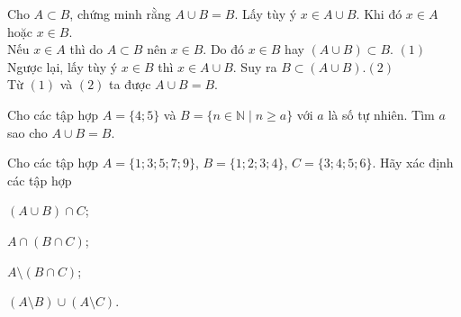 \begin{bt}%
Cho $A\subset B$, chứng minh rằng $A\cup B=B$.
\loigiai
{Lấy tùy ý $x\in A\cup B$. Khi đó $x\in A$ hoặc $x\in B$.\\
Nếu $x\in A$ thì do $A\subset B$ nên $x\in B$. Do đó $x\in B$ hay $(A\cup B)\subset B$. \hfill $(1)$\\
Ngược lại, lấy tùy ý $x\in B$ thì $x\in A\cup B$. Suy ra  $B\subset (A\cup B)$.\hfill $(2)$\\
Từ $(1)$ và $(2)$ ta được $A\cup B=B$.
}
\end{bt}

\begin{bt}%
	Cho các tập hợp $A=\{4;5\}$ và $B=\{n\in \mathbb{N}\mid n\geq a\}$ với $a$ là số tự nhiên. Tìm $a$ sao cho $A\cup B=B$.
\end{bt}

\begin{bt}%
	Cho các tập hợp $A=\big\{1;3;5;7;9\big\}$, $B=\big\{1;2;3;4\big\}$, $C=\big\{3;4;5;6\big\}$. Hãy xác định các tập hợp
	\begin{listEX}[2]
		\item $(A \cup B) \cap C$;
		\item $A \cap (B \cap C)$;
		\item $A \setminus (B \cap C)$;
		\item $(A \setminus B) \cup (A \setminus C)$.
	\end{listEX}
\end{bt}

